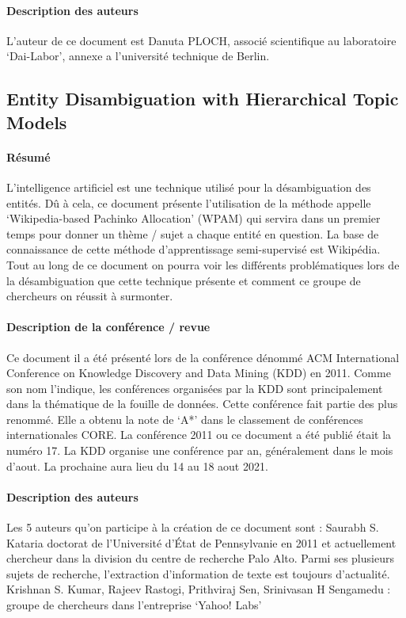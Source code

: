 \documentclass{article}
\begin{document}
\paragraph{Description des auteurs}
L’auteur de ce document est Danuta PLOCH, associé scientifique au laboratoire ‘Dai-Labor’, annexe a l’université technique de Berlin.


\subsection{Entity Disambiguation with Hierarchical Topic Models \cite{article-14}}

\paragraph{Résumé}
L’intelligence artificiel est une technique utilisé pour la désambiguation des entités. Dû à cela, ce document présente l’utilisation de la méthode appelle ‘Wikipedia-based
Pachinko Allocation’ (WPAM) qui servira dans un premier temps pour donner un thème / sujet a chaque entité en question. La base de connaissance de cette méthode d’apprentissage semi-supervisé est Wikipédia.  Tout au long de ce document on pourra voir les différents problématiques lors de la désambiguation que cette technique présente et comment ce groupe de chercheurs on réussit à surmonter. 



\paragraph{Description de la conférence / revue}
Ce document il a été présenté lors de la conférence dénommé ACM International Conference on Knowledge Discovery and Data Mining (KDD) en 2011. 
Comme son nom l’indique, les conférences organisées par la KDD sont principalement dans la thématique de la fouille de données. Cette conférence fait partie des plus renommé. Elle a obtenu la note de ‘A*’ dans le classement de conférences internationales CORE. 
La conférence 2011 ou ce document a été publié était la numéro 17. La KDD organise une conférence par an, généralement dans le mois d’aout. La prochaine aura lieu du 14 au 18 aout 2021.


\paragraph{Description des auteurs}
Les 5 auteurs qu’on participe à la création de ce document sont :
Saurabh S. Kataria doctorat de l’Université d’État de Pennsylvanie en 2011 et actuellement chercheur dans la division du centre de recherche Palo Alto. Parmi ses plusieurs sujets de recherche, l’extraction d’information de texte est toujours d’actualité.
Krishnan S. Kumar, Rajeev Rastogi, Prithviraj Sen, Srinivasan H Sengamedu : groupe de chercheurs dans l’entreprise ‘Yahoo! Labs’
\end{document}
